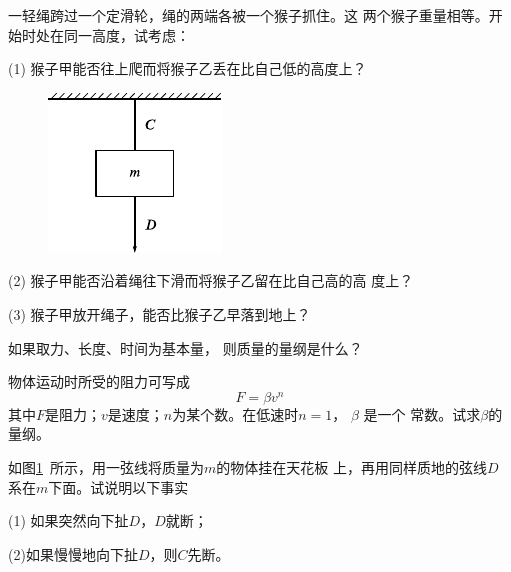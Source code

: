 \begin{questions}
  \question 一轻绳跨过一个定滑轮，绳的两端各被一个猴子抓住。这
  两个猴子重量相等。开始时处在同一高度，试考虑：

  (1) 猴子甲能否往上爬而将猴子乙丢在比自己低的高度上？

  \begin{figure}
    \centering
    \includegraphics{figure/fig03.21}
    \caption{}
    \label{fig:03.21}
  \end{figure}
  (2) 猴子甲能否沿着绳往下滑而将猴子乙留在比自己高的高
  度上？

  (3) 猴子甲放开绳子，能否比猴子乙早落到地上？

  \question 如果取力、长度、时间为基本量，
  则质量的量纲是什么？

  \question 物体运动时所受的阻力可写成
  \begin{equation*}
      F = \beta v ^ n
  \end{equation*}
  其中$ F $是阻力；$ v $是速度；$ n $为某个数。在低速时$  n = 1  $， $ \beta $  是一个
  常数。试求$ \beta $的量纲。

  \question 如图\ref{fig:03.21}~所示，用一弦线将质量为$ m $的物体挂在天花板
  上，再用同样质地的弦线$ D $系在$ m $下面。试说明以下事实

  (1) 如果突然向下扯$ D $，$ D $就断；

  (2)如果慢慢地向下扯$ D $，则$ C $先断。
\end{questions}



